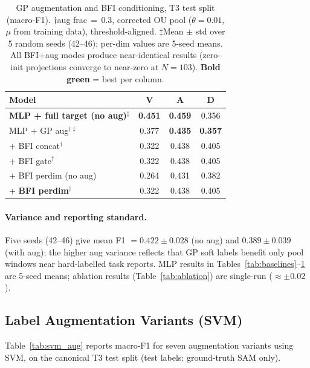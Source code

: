 \documentclass[sigconf,review,anonymous]{acmart}
\newcommand{\best}[1]{\textbf{\textcolor{bestcol}{#1}}}
\begin{document}
\begin{table}[t]
\caption{GP augmentation and BFI conditioning, T3 test split (macro-F1).
  $\dagger$aug frac\,$=$\,0.3, corrected OU pool ($\theta{=}0.01$, $\mu$ from
  training data), threshold-aligned.
  $\ddagger$Mean $\pm$ std over 5 random seeds (42--46); per-dim values are
  5-seed means.
  All BFI+aug modes produce near-identical results (zero-init projections
  converge to near-zero at $N=103$).
  \best{Bold green} = best per column.}
\label{tab:main}
\centering
\setlength{\tabcolsep}{4.5pt}
\begin{tabular}{lccc}
\toprule
\textbf{Model} & \textbf{V} & \textbf{A} & \textbf{D} \\
\midrule
\best{MLP + full target (no aug)$^\ddagger$} & \best{0.451} & \best{0.459} & 0.356 \\
MLP + GP aug$^{\dagger\ddagger}$     & 0.377 & \best{0.435} & \best{0.357} \\
\midrule
+ BFI concat$^\dagger$               & 0.322 & 0.438 & 0.405 \\
+ BFI gate$^\dagger$                 & 0.322 & 0.438 & 0.405 \\
+ BFI perdim (no aug)                & 0.264 & 0.431 & 0.382 \\
+ \textbf{BFI perdim}$^\dagger$      & 0.322 & 0.438 & 0.405 \\
\bottomrule
\end{tabular}
\end{table}

\paragraph{Variance and reporting standard.}
Five seeds (42--46) give mean F1 $= 0.422 \pm 0.028$ (no aug) and
$0.389 \pm 0.039$ (with aug); the higher aug variance reflects that GP soft
labels benefit only pool windows near hard-labelled task reports.
MLP results in Tables~\ref{tab:baselines}--\ref{tab:main} are 5-seed means;
ablation results (Table~\ref{tab:ablation}) are single-run ($\approx\pm0.02$).

\subsection{Label Augmentation Variants (SVM)}
\label{sec:aug_results}

Table~\ref{tab:svm_aug} reports macro-F1 for seven augmentation variants
using SVM, on the canonical T3 test split (test labels: ground-truth SAM only).
\end{document}
